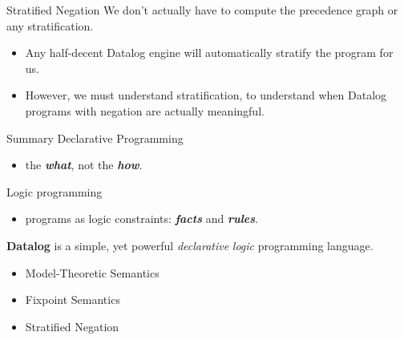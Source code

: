 \begin{frame}{Stratified Negation}
We don't actually have to compute the precedence graph or any stratification.
\begin{itemize}
    \item Any half-decent Datalog engine will automatically stratify the program for us.
    \item However, we must understand stratification, to understand when Datalog
    programs with negation are actually meaningful.
\end{itemize}
\end{frame}

\begin{frame}{Summary}
Declarative Programming
\begin{itemize}
    \item the \textbf{\emph{what}}, not the \textbf{\emph{how}}.
\end{itemize}

\pause

Logic programming
\begin{itemize}
    \item programs as logic constraints: \textbf{\emph{facts}} and \textbf{\emph{rules}}.
\end{itemize}

\pause

\textbf{Datalog} is a simple, yet powerful \emph{declarative} \emph{logic}
programming language.
\begin{itemize}
    \item Model-Theoretic Semantics
    \item Fixpoint Semantics
    \item Stratified Negation
\end{itemize}
\end{frame}

\begin{frame}[standout]
\end{frame}


